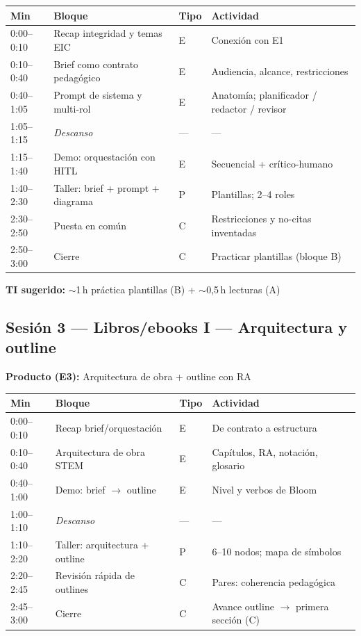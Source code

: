 \begin{tabularx}{\textwidth}{@{}lllX@{}}
\toprule
Min & Bloque & Tipo & Actividad \\
\midrule
0:00--0:10 & Recap integridad y temas EIC & E & Conexión con E1 \\
0:10--0:40 & Brief como contrato pedagógico & E & Audiencia, alcance, restricciones \\
0:40--1:05 & Prompt de sistema y multi-rol & E & Anatomía; planificador / redactor / revisor \\
1:05--1:15 & \emph{Descanso} & --- & --- \\
1:15--1:40 & Demo: orquestación con HITL & E & Secuencial + crítico-humano \\
1:40--2:30 & Taller: brief + prompt + diagrama & P & Plantillas; 2--4 roles \\
2:30--2:50 & Puesta en común & C & Restricciones y no-citas inventadas \\
2:50--3:00 & Cierre & C & Practicar plantillas (bloque B) \\
\bottomrule
\end{tabularx}

\textbf{TI sugerido:} $\sim$1\,h práctica plantillas (B) + $\sim$0{,}5\,h lecturas (A)

\subsection{Sesión 3 --- Libros/ebooks I --- Arquitectura y outline}
\textbf{Producto (E3):} Arquitectura de obra + outline con RA

\begin{tabularx}{\textwidth}{@{}lllX@{}}
\toprule
Min & Bloque & Tipo & Actividad \\
\midrule
0:00--0:10 & Recap brief/orquestación & E & De contrato a estructura \\
0:10--0:40 & Arquitectura de obra STEM & E & Capítulos, RA, notación, glosario \\
0:40--1:00 & Demo: brief $\rightarrow$ outline & E & Nivel y verbos de Bloom \\
1:00--1:10 & \emph{Descanso} & --- & --- \\
1:10--2:20 & Taller: arquitectura + outline & P & 6--10 nodos; mapa de símbolos \\
2:20--2:45 & Revisión rápida de outlines & C & Pares: coherencia pedagógica \\
2:45--3:00 & Cierre & C & Avance outline $\rightarrow$ primera sección (C) \\
\bottomrule
\end{tabularx}

